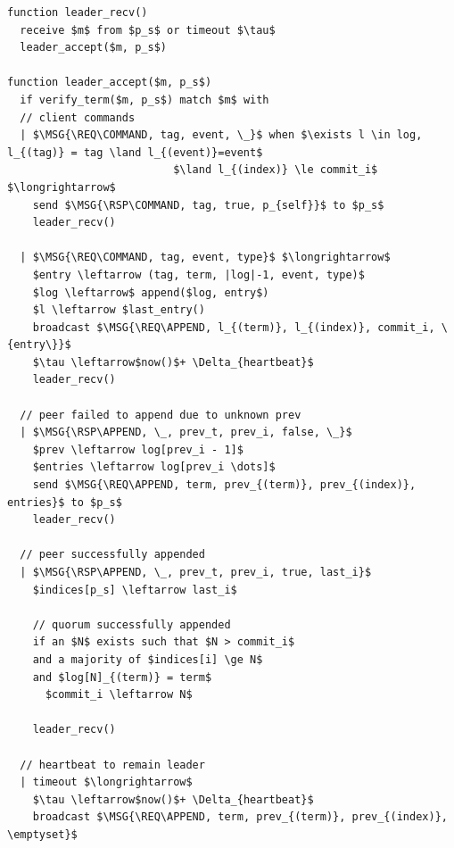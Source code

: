 \documentclass{article}
\begin{document}
	\begin{mdframed}[backgroundcolor=Papyrus]
	\begin{lstlisting}[style=pseudo, caption={Leader logic.}]
function leader_recv()
  receive $m$ from $p_s$ or timeout $\tau$
  leader_accept($m, p_s$)

function leader_accept($m, p_s$)
  if verify_term($m, p_s$) match $m$ with
  // client commands
  | $\MSG{\REQ\COMMAND, tag, event, \_}$ when $\exists l \in log, l_{(tag)} = tag \land l_{(event)}=event$
                          $\land l_{(index)} \le commit_i$ $\longrightarrow$
    send $\MSG{\RSP\COMMAND, tag, true, p_{self}}$ to $p_s$
    leader_recv()

  | $\MSG{\REQ\COMMAND, tag, event, type}$ $\longrightarrow$
    $entry \leftarrow (tag, term, |log|-1, event, type)$
    $log \leftarrow$ append($log, entry$)
    $l \leftarrow $last_entry()
    broadcast $\MSG{\REQ\APPEND, l_{(term)}, l_{(index)}, commit_i, \{entry\}}$
    $\tau \leftarrow$now()$+ \Delta_{heartbeat}$
    leader_recv()

  // peer failed to append due to unknown prev
  | $\MSG{\RSP\APPEND, \_, prev_t, prev_i, false, \_}$
    $prev \leftarrow log[prev_i - 1]$
    $entries \leftarrow log[prev_i \dots]$
    send $\MSG{\REQ\APPEND, term, prev_{(term)}, prev_{(index)}, entries}$ to $p_s$
    leader_recv()

  // peer successfully appended
  | $\MSG{\RSP\APPEND, \_, prev_t, prev_i, true, last_i}$
    $indices[p_s] \leftarrow last_i$

    // quorum successfully appended
    if an $N$ exists such that $N > commit_i$
    and a majority of $indices[i] \ge N$
    and $log[N]_{(term)} = term$
      $commit_i \leftarrow N$

    leader_recv()

  // heartbeat to remain leader
  | timeout $\longrightarrow$
    $\tau \leftarrow$now()$+ \Delta_{heartbeat}$
    broadcast $\MSG{\REQ\APPEND, term, prev_{(term)}, prev_{(index)}, \emptyset}$
	\end{lstlisting}
	\end{mdframed}
\end{document}
